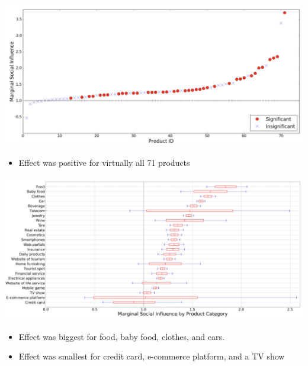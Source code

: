 \documentclass[aspectratio=169]{beamer}
\begin{document}
\begin{frame}

\begin{center}
\includegraphics[width=\textwidth]{figures/huang_social_2020_fig3}
\end{center}

\begin{itemize}
\item Effect was positive for virtually all 71 products
\end{itemize}

\end{frame}
\begin{frame}

\begin{center}
\includegraphics[width=\textwidth]{figures/huang_social_2020_fig4}
\end{center}

\begin{itemize}
\item Effect was biggest for food, baby food, clothes, and cars.
\item Effect was smallest for credit card, e-commerce platform, and a TV show
\end{itemize}

\end{frame}
\end{document}
